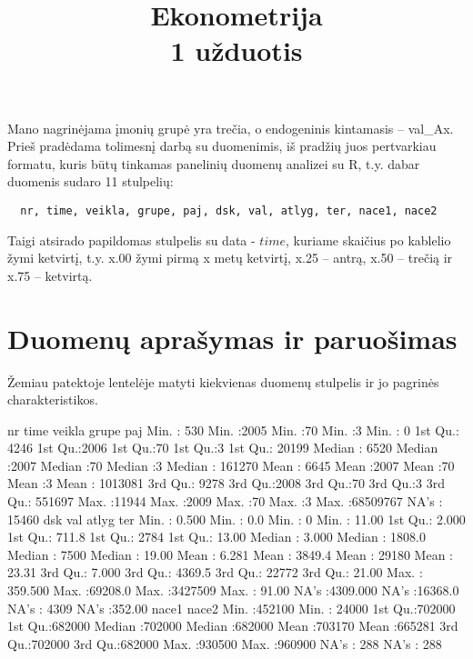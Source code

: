 \documentclass[a4paper]{article}
\title{Ekonometrija \\1 užduotis}
\newcommand{\R}{R}
\begin{document}
\maketitle

Mano nagrinėjama įmonių grupė yra trečia, o endogeninis kintamasis --
val\_Ax. Prieš pradėdama tolimesnį darbą su duomenimis, iš pradžių
juos pertvarkiau formatu, kuris būtų tinkamas panelinių duomenų
analizei su \R{}, t.y. dabar duomenis sudaro 11 stulpelių:
\begin{verbatim}
  nr, time, veikla, grupe, paj, dsk, val, atlyg, ter, nace1, nace2
\end{verbatim}  

Taigi atsirado papildomas stulpelis su data - $time$, kuriame skaičius
po kablelio žymi ketvirtį, t.y. x.00 žymi pirmą x metų ketvirtį, x.25
-- antrą, x.50 -- trečią ir x.75 -- ketvirtą.
\section{Duomenų aprašymas ir paruošimas}
Žemiau patektoje lentelėje matyti kiekvienas duomenų stulpelis ir jo
pagrinės charakteristikos.
\begin{Schunk}
\begin{Soutput}
       nr             time          veikla       grupe        paj          
 Min.   :  530   Min.   :2005   Min.   :70   Min.   :3   Min.   :       0  
 1st Qu.: 4246   1st Qu.:2006   1st Qu.:70   1st Qu.:3   1st Qu.:   20199  
 Median : 6520   Median :2007   Median :70   Median :3   Median :  161270  
 Mean   : 6645   Mean   :2007   Mean   :70   Mean   :3   Mean   : 1013081  
 3rd Qu.: 9278   3rd Qu.:2008   3rd Qu.:70   3rd Qu.:3   3rd Qu.:  551697  
 Max.   :11944   Max.   :2009   Max.   :70   Max.   :3   Max.   :68509767  
                                                         NA's   :   15460  
      dsk                val              atlyg              ter        
 Min.   :   0.500   Min.   :    0.0   Min.   :      0   Min.   : 11.00  
 1st Qu.:   2.000   1st Qu.:  711.8   1st Qu.:   2784   1st Qu.: 13.00  
 Median :   3.000   Median : 1808.0   Median :   7500   Median : 19.00  
 Mean   :   6.281   Mean   : 3849.4   Mean   :  29180   Mean   : 23.31  
 3rd Qu.:   7.000   3rd Qu.: 4369.5   3rd Qu.:  22772   3rd Qu.: 21.00  
 Max.   : 359.500   Max.   :69208.0   Max.   :3427509   Max.   : 91.00  
 NA's   :4309.000   NA's   :16368.0   NA's   :   4309   NA's   :352.00  
     nace1            nace2       
 Min.   :452100   Min.   : 24000  
 1st Qu.:702000   1st Qu.:682000  
 Median :702000   Median :682000  
 Mean   :703170   Mean   :665281  
 3rd Qu.:702000   3rd Qu.:682000  
 Max.   :930500   Max.   :960900  
 NA's   :   288   NA's   :   288  
\end{Soutput}
\end{Schunk}
\end{document}
